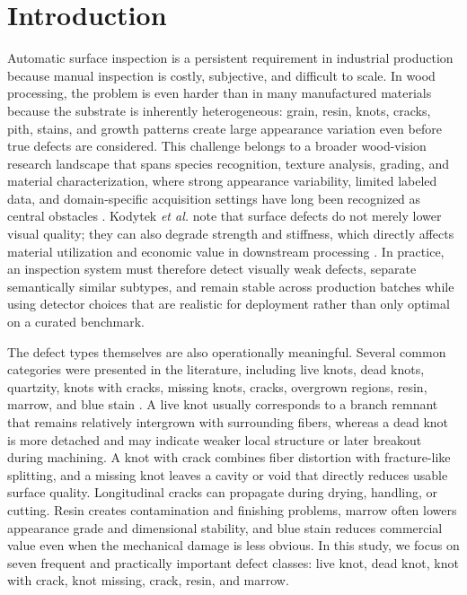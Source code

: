 \documentclass[journal,article,submit,moreauthors,pdftex]{Definitions/tsp}
\begin{document}
\section{Introduction}
\label{sec:introduction}

Automatic surface inspection is a persistent requirement in industrial production because manual inspection is costly, subjective, and difficult to scale. In wood processing, the problem is even harder than in many manufactured materials because the substrate is inherently heterogeneous: grain, resin, knots, cracks, pith, stains, and growth patterns create large appearance variation even before true defects are considered. This challenge belongs to a broader wood-vision research landscape that spans species recognition, texture analysis, grading, and material characterization, where strong appearance variability, limited labeled data, and domain-specific acquisition settings have long been recognized as central obstacles \citep{hwang_sugiyama_review,da_silva_2017,souza_2020,de_geus_2021,kirbas_2022,he_2021_woodresearch,herrera_poyatos_2024}. Kodytek \textit{et al.} note that surface defects do not merely lower visual quality; they can also degrade strength and stiffness, which directly affects material utilization and economic value in downstream processing \citep{kodytek_dataset}. In practice, an inspection system must therefore detect visually weak defects, separate semantically similar subtypes, and remain stable across production batches while using detector choices that are realistic for deployment rather than only optimal on a curated benchmark.

The defect types themselves are also operationally meaningful. Several common categories were presented in the literature, including live knots, dead knots, quartzity, knots with cracks, missing knots, cracks, overgrown regions, resin, marrow, and blue stain \citep{kodytek_dataset}. A live knot usually corresponds to a branch remnant that remains relatively intergrown with surrounding fibers, whereas a dead knot is more detached and may indicate weaker local structure or later breakout during machining. A knot with crack combines fiber distortion with fracture-like splitting, and a missing knot leaves a cavity or void that directly reduces usable surface quality. Longitudinal cracks can propagate during drying, handling, or cutting. Resin creates contamination and finishing problems, marrow often lowers appearance grade and dimensional stability, and blue stain reduces commercial value even when the mechanical damage is less obvious. In this study, we focus on seven frequent and practically important defect classes: live knot, dead knot, knot with crack, knot missing, crack, resin, and marrow. 
\end{document}
